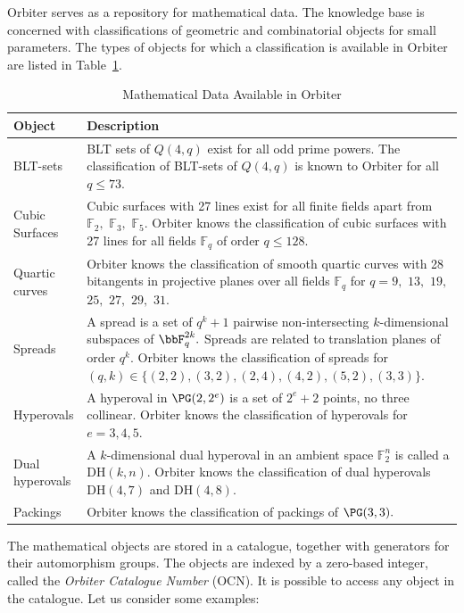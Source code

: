 Orbiter serves as a repository for mathematical data. 
The knowledge base is concerned with classifications of 
geometric and combinatorial objects for small parameters.
The types of objects for which a classification is available in Orbiter are listed in Table~\ref{tab:mathdata}. 
\begin{table}
\begin{center}
\begin{tabular}{|p{5cm}|p{9cm}|}
\hline
Object & Description \\
\hline
\hline
BLT-sets & BLT sets of $Q(4,q)$ exist for all odd prime powers. 
The classification of BLT-sets of $Q(4,q)$ is known to Orbiter for all $q \le 73.$\\
\hline
Cubic Surfaces & Cubic surfaces with 27 lines exist 
for all finite fields apart from ${\mathbb F}_2,$ ${\mathbb F}_3,$ ${\mathbb F}_5.$ 
Orbiter knows the classification of cubic surfaces with 27 lines 
for all fields ${\mathbb F}_q$ of order $q \le 128.$  \\
\hline
Quartic curves & Orbiter knows the classification of smooth quartic curves with 28 bitangents 
in projective planes over all fields ${\mathbb F}_q$ for $q=9,$ $13,$ $19,$ $25,$ $27,$ $29,$ $31.$ \\
\hline
Spreads & A spread is a set of $q^k+1$ pairwise non-intersecting $k$-dimensional subspaces 
of $\bbF_q^{2k}.$ 
Spreads are related to translation planes of order $q^k$.
Orbiter knows the classification of spreads for 
$(q,k) \in \{(2,2), (3,2), (2,4), (4,2), (5,2), (3,3)\}.$ \\
\hline
Hyperovals & A hyperoval in $\PG(2,2^e)$ is a set of $2^e+2$ points, no three collinear.
Orbiter knows the classification of hyperovals for $e=3,4,5.$\\
\hline
Dual hyperovals & A $k$-dimensional dual hyperoval in an ambient space ${\mathbb F}_2^n$ is called a DH$(k,n).$ Orbiter knows the classification of dual hyperovals DH$(4,7)$ and  DH$(4,8).$ \\
\hline
Packings & Orbiter knows the classification of packings of $\PG(3,3).$\\
\hline
\end{tabular}
\end{center}
\caption{\label{tab:mathdata}Mathematical Data Available in Orbiter}
\end{table}
The mathematical objects are stored in a catalogue, together with generators for their automorphism groups. 
The objects are indexed by a zero-based integer, called the {\em Orbiter Catalogue Number} (OCN).
It is possible to access any object in the catalogue. 
Let us consider some examples:


